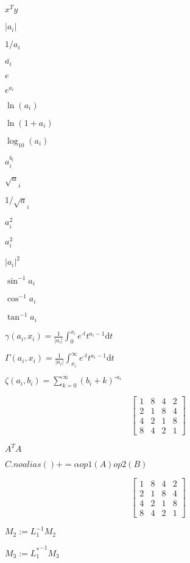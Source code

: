 \documentclass{article}
\begin{document}
$ x^Ty $
\pagebreak

$ |a_i| $
\pagebreak

$ 1/a_i $
\pagebreak

$ \bar{a_i} $
\pagebreak

$ e $
\pagebreak

$ e^{a_i} $
\pagebreak

$ \ln({a_i}) $
\pagebreak

$ \ln({1+a_i}) $
\pagebreak

$ \log_{10}({a_i}) $
\pagebreak

$ a_i ^ {b_i} $
\pagebreak

$ \sqrt a_i $
\pagebreak

$ 1/{\sqrt a_i} $
\pagebreak

$ a_i^2 $
\pagebreak

$ a_i^3 $
\pagebreak

$ |a_i|^2 $
\pagebreak

$ \sin^{-1} a_i $
\pagebreak

$ \cos^{-1} a_i $
\pagebreak

$ \tan^{-1} a_i $
\pagebreak

$ \gamma(a_i,x_i)= \frac{1}{|a_i|} \int_{0}^{x_i}e^{\text{-}t} t^{a_i-1} \mathrm{d} t $
\pagebreak

$ \Gamma(a_i,x_i) = \frac{1}{|a_i|} \int_{x_i}^{\infty}e^{\text{-}t} t^{a_i-1} \mathrm{d} t $
\pagebreak

$ \zeta(a_i,b_i)=\sum_{k=0}^{\infty}(b_i+k)^{\text{-}a_i} $
\pagebreak

\[ \begin{bmatrix}
    1 & 8 & 4 & 2 \\
    2 & 1 & 8 & 4 \\
    4 & 2 & 1 & 8 \\
    8 & 4 & 2 & 1
\end{bmatrix} \]
\pagebreak

$ A^T A $
\pagebreak

$ C.noalias() += \alpha op1(A) op2(B) $
\pagebreak

\[ \begin{bmatrix} 
    1 & 8 & 4 & 2 \\ 
    2 & 1 & 8 & 4 \\
    4 & 2 & 1 & 8 \\
    8 & 4 & 2 & 1
\end{bmatrix} \]
\pagebreak

$ M_2 := L_1^{-1} M_2 $
\pagebreak

$ M_3 := {L_1^*}^{-1} M_3 $
\pagebreak
\end{document}

